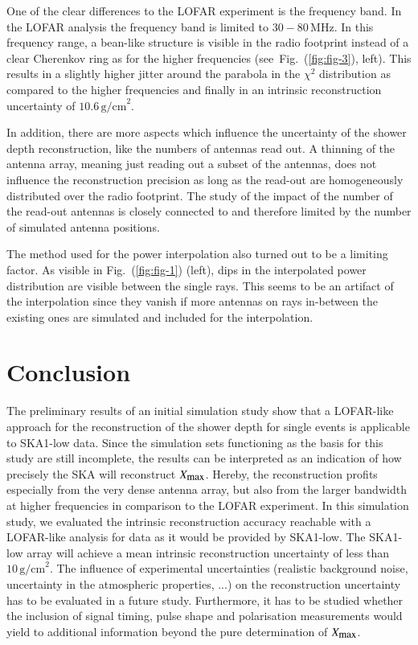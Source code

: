 \documentclass[epj]{webofc}
\newcommand*{\figref}[1]{Fig.~(\ref{fig:#1})}
\begin{document}
One of the clear differences to the LOFAR experiment is the frequency band. In the LOFAR analysis the frequency band is limited to $30-80\,\mbox{MHz}$. In this frequency range, a bean-like structure is visible in the radio footprint instead of a clear Cherenkov ring as for the higher frequencies (see~\figref{fig-3}, left). This results in a slightly higher jitter around the parabola in the $\chi^2$ distribution as compared to the higher frequencies and finally in an intrinsic reconstruction uncertainty of $10.6\,\mbox{g/cm}^2$.


In addition, there are more aspects which influence the uncertainty of the shower depth reconstruction, like the numbers of antennas read out.
A thinning of the antenna array, meaning just reading out a subset of the antennas, does not influence the reconstruction precision as long as the read-out are homogeneously distributed over the radio footprint. The study of the impact of the number of the read-out antennas is closely connected to and therefore limited by the number of simulated antenna positions.

The method used for the power interpolation also turned out to be a limiting factor. As visible in \figref{fig-1} (left), dips in the interpolated power distribution are visible between the single rays. This seems to be an artifact of the interpolation since they vanish if more antennas on rays in-between the existing ones are simulated and included for the interpolation. 
%
\vspace{-0.1cm}
%
\section{Conclusion}
\vspace{-0.17cm}
The preliminary results of an initial simulation study show that a LOFAR-like approach for the reconstruction of the shower depth for single events is applicable to SKA1-low data. 
Since the simulation sets functioning as the basis for this study are still incomplete, the results can be interpreted as an indication of how precisely the SKA will reconstruct $X_{\mbox{\small max}}$. Hereby, the reconstruction profits especially from the very dense antenna array, but also from the larger bandwidth at higher frequencies in comparison to the LOFAR experiment. 
In this simulation study, we evaluated the intrinsic reconstruction accuracy reachable with a LOFAR-like analysis for data as it would be provided by SKA1-low. The SKA1-low array will achieve a mean intrinsic reconstruction uncertainty of less than $10\,\mbox{g/cm}^2$. The influence of experimental uncertainties (realistic background noise, uncertainty in the atmospheric properties, ...) on the reconstruction uncertainty has to be evaluated in a future study. 
Furthermore, it has to be studied whether the inclusion of signal timing, pulse shape and polarisation measurements would yield to additional information beyond the pure determination of $X_{\mbox{\small max}}$.
\end{document}
